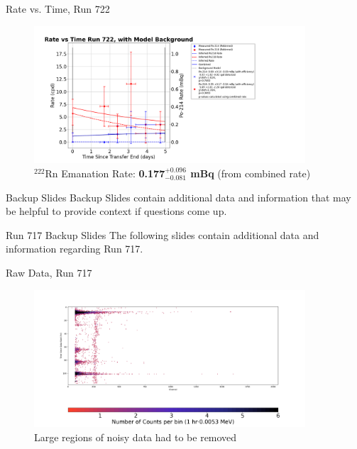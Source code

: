\documentclass[aspectratio=169]{beamer}
\begin{document}
\begin{frame}{Rate vs. Time, Run 722}
\label{RvT_730}
    \begin{figure}
        \begin{center}
            \includegraphics[width=0.9\textwidth]
            {assets/722/RvT.png}
            \caption{$^{222}$Rn Emanation Rate: 
            \textbf{0.177$^{+0.096}_{-0.081}$ mBq} (from combined rate)}
        \end{center}
    \end{figure}    
\end{frame}

\begin{frame}{Backup Slides}
    Backup Slides contain additional data and information that may be helpful
    to provide context if questions come up.
\end{frame}

\begin{frame}{Run 717 Backup Slides}
\label{717_Backup}
    The following slides contain additional data and information regarding Run 717.
\end{frame}

\begin{frame}{Raw Data, Run 717}
    \begin{figure}
        \begin{center}
            \includegraphics[width=0.9\textwidth]
            {assets/717/RD.png}
            \caption{Large regions of noisy data had to be removed}
        \end{center}
    \end{figure}
\end{frame}
\end{document}
